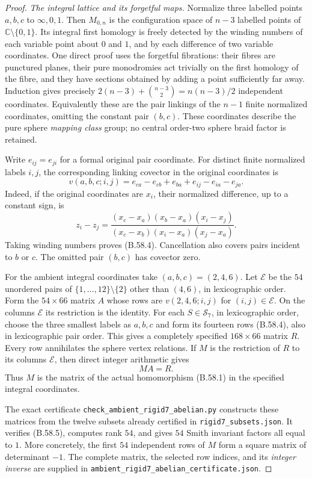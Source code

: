 \begin{proof}
\emph{The integral lattice and its forgetful maps.}
Normalize three labelled points $a,b,c$ to
$\infty,0,1$.  Then $M_{0,n}$ is the configuration space
of $n-3$ labelled points of $\mathbb C\setminus\{0,1\}$.
Its integral first homology is freely detected by the
winding numbers of each variable point about $0$ and $1$,
and by each difference of two variable coordinates.
One direct proof uses the forgetful fibrations: their fibres
are punctured planes, their pure monodromies act trivially
on the first homology of the fibre, and they have sections
obtained by adding a point sufficiently far away.
Induction gives precisely
$2(n-3)+\binom{n-3}{2}=n(n-3)/2$ independent coordinates.
Equivalently these are the pair linkings of the $n-1$
finite normalized coordinates, omitting the constant pair
$(b,c)$.  These coordinates describe the pure sphere
\emph{mapping class} group; no central order-two sphere
braid factor is retained.

Write $e_{ij}=e_{ji}$ for a formal original pair coordinate.
For distinct finite normalized labels $i,j$, the corresponding
linking covector in the original coordinates is
\[
 v(a,b,c;i,j)
   =e_{ca}-e_{cb}+e_{ba}+e_{ij}-e_{ia}-e_{ja}.                \tag{B.58.4}
\]
Indeed, if the original coordinates are $x_i$, their
normalized difference, up to a constant sign, is
\[
 z_i-z_j=
 \frac{(x_c-x_a)(x_b-x_a)(x_i-x_j)}
      {(x_c-x_b)(x_i-x_a)(x_j-x_a)}.
\]
Taking winding numbers proves (B.58.4).
Cancellation also covers pairs incident to $b$ or $c$.
The omitted pair $(b,c)$ has covector zero.

For the ambient integral coordinates take $(a,b,c)=(2,4,6)$.
Let $\mathcal E$ be the $54$ unordered pairs of
$\{1,\ldots,12\}\setminus\{2\}$ other than $(4,6)$,
in lexicographic order.  Form the $54\times66$ matrix $A$
whose rows are $v(2,4,6;i,j)$ for $(i,j)\in\mathcal E$.
On the columns $\mathcal E$ its restriction is the identity.
For each $S\in\mathscr S_7$, in lexicographic order, choose
the three smallest labels as $a,b,c$ and form its fourteen
rows (B.58.4), also in lexicographic pair order.  This gives
a completely specified $168\times66$ matrix $R$.
Every row annihilates the sphere vertex relations.
If $M$ is the restriction of $R$ to its columns
$\mathcal E$, then direct integer arithmetic gives
\[
                         MA=R.                             \tag{B.58.5}
\]
Thus $M$ is the matrix of the actual homomorphism (B.58.1)
in the specified integral coordinates.

The exact certificate
\nolinkurl{check_ambient_rigid7_abelian.py}
constructs these matrices from the twelve subsets already
certified in \nolinkurl{rigid7_subsets.json}.
It verifies (B.58.5), computes rank $54$, and gives
$54$ Smith invariant factors all equal to $1$.
More concretely, the first $54$ independent rows of $M$
form a square matrix of determinant $-1$.
The complete matrix, the selected row indices, and its
\emph{integer inverse} are supplied in
\nolinkurl{ambient_rigid7_abelian_certificate.json}.


\end{proof}
